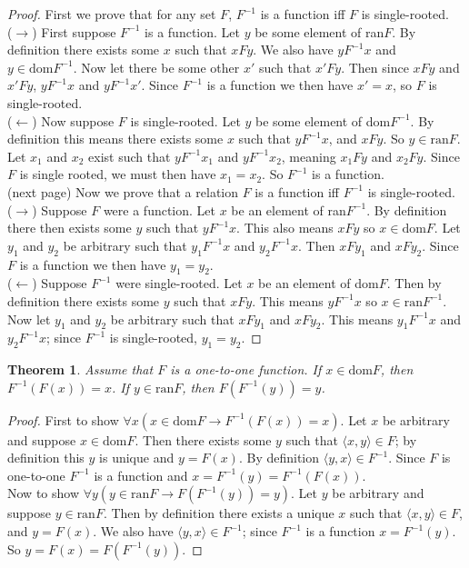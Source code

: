 \documentclass{report}
\newtheorem{theorem}[theo]{Theorem}
\begin{document}
\begin{proof}
First we prove that for any set $F$, $F^{-1}$ is a function iff $F$ is single-rooted.\\
\indent($\rightarrow$)
First suppose $F^{-1}$ is a function. Let $y$ be some element of ran$F$. By definition there exists some $x$ such that $xFy$. We also have $yF^{-1}x$ and $y\in\text{dom}F^{-1}$.
Now let there be some other $x'$ such that $x'Fy$.
Then since $xFy$ and $x'Fy$, $yF^{-1}x$ and $yF^{-1}x'$. Since $F^{-1}$ is a function we then have $x'=x$, so $F$ is single-rooted.\\
\indent($\leftarrow$) Now suppose $F$ is single-rooted. Let $y$ be some element of dom$F^{-1}$. By definition this means there exists some $x$ such that
$yF^{-1}x$, and $xFy$. So $y\in\text{ran}F$. Let $x_1$ and $x_2$ exist such that $yF^{-1}x_1$ and $yF^{-1}x_2$, meaning $x_1Fy$ and $x_2Fy$. Since $F$ is single rooted, we must
then have $x_1=x_2$. So $F^{-1}$ is a function.\\
(next page)\newpage
Now we prove that a relation $F$ is a function iff $F^{-1}$ is single-rooted.\\
\indent($\rightarrow$) Suppose $F$ were a function. Let $x$ be an element of ran$F^{-1}$.
By definition there then exists some $y$ such that $yF^{-1}x$. This also means $xFy$ so $x\in\text{dom}F$. Let $y_1$ and $y_2$ be arbitrary such that $y_1F^{-1}x$ and $y_2F^{-1}x$. Then $xFy_1$
and $xFy_2$. Since $F$ is a function we then have $y_1=y_2$.\\
\indent($\leftarrow$) Suppose $F^{-1}$ were single-rooted. Let $x$ be an element of dom$F$. Then by definition there exists some $y$ such that $xFy$. This means $yF^{-1}x$ so $x\in\text{ran}F^{-1}$.
Now let $y_1$ and $y_2$ be arbitrary such that $xFy_1$ and $xFy_2$. This means $y_1F^{-1}x$ and $y_2F^{-1}x$; since $F^{-1}$ is single-rooted, $y_1=y_2$.
\end{proof}
\begin{theorem}\label{theorems1}
Assume that $F$ is a one-to-one function. If $x\in\text{dom}F$, then $F^{-1}(F(x))=x$. If $y\in\text{ran}F$, then $F(F^{-1}(y))=y$.
\end{theorem}
\begin{proof}
First to show $\forall x(x\in\text{dom}F\to F^{-1}(F(x))=x)$. Let $x$ be arbitrary and suppose $x\in\text{dom}F$. Then there exists some $y$ such that $\langle x,y\rangle\in F$; by definition
this $y$ is unique and $y=F(x)$. By definition $\langle y,x\rangle\in F^{-1}$. Since $F$ is one-to-one $F^{-1}$ is a function and $x=F^{-1}(y)=F^{-1}(F(x))$.\\
\indent Now to show $\forall y(y\in\text{ran}F\to F(F^{-1}(y))=y)$. Let $y$ be arbitrary and suppose $y\in\text{ran}F$. Then by definition there exists a unique $x$ such that 
$\langle x,y\rangle\in F$, and $y=F(x)$. We also have $\langle y,x\rangle\in F^{-1}$; since $F^{-1}$ is a function $x=F^{-1}(y)$. So $y=F(x)=F(F^{-1}(y))$.
\end{proof}
\end{document}
